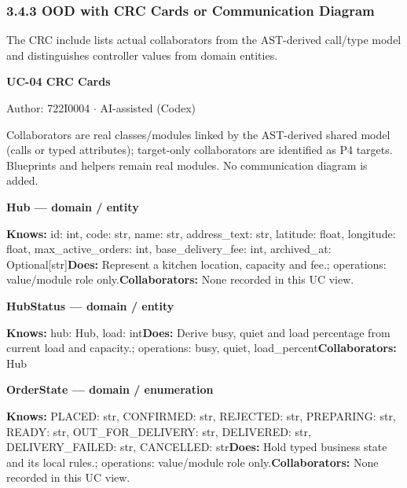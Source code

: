 \subsubsection*{3.4.3 OOD with CRC Cards or Communication Diagram}
\label{CRC-UC-04}
The CRC include lists actual collaborators from the AST-derived call/type model and distinguishes controller values from domain entities.

\textbf{UC-04 CRC Cards}

Author: 722I0004 \ensuremath{\cdot} AI-assisted (Codex)

Collaborators are real classes/modules linked by the AST-derived shared model (calls or typed attributes); target-only collaborators are identified as P4 targets. Blueprints and helpers remain real modules. No communication diagram is added.

\textbf{Hub --- domain / \guillemotleft{}entity\guillemotright{}}

\textbf{Knows:} id: int, code: str, name: str, address\_text: str, latitude: float, longitude: float, max\_active\_orders: int, base\_delivery\_fee: int, archived\_at: Optional[str]\newline{}\textbf{Does:} Represent a kitchen location, capacity and fee.; operations: value/module role only.\newline{}\textbf{Collaborators:} None recorded in this UC view.

\textbf{HubStatus --- domain / \guillemotleft{}entity\guillemotright{}}

\textbf{Knows:} hub: Hub, load: int\newline{}\textbf{Does:} Derive busy, quiet and load percentage from current load and capacity.; operations: busy, quiet, load\_percent\newline{}\textbf{Collaborators:} Hub

\textbf{OrderState --- domain / \guillemotleft{}enumeration\guillemotright{}}

\textbf{Knows:} PLACED: str, CONFIRMED: str, REJECTED: str, PREPARING: str, READY: str, OUT\_FOR\_DELIVERY: str, DELIVERED: str, DELIVERY\_FAILED: str, CANCELLED: str\newline{}\textbf{Does:} Hold typed business state and its local rules.; operations: value/module role only.\newline{}\textbf{Collaborators:} None recorded in this UC view.

